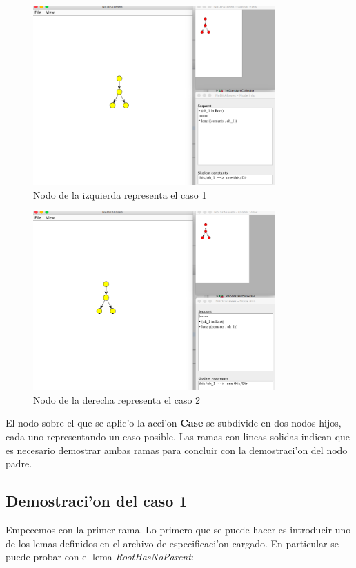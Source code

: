 \begin{figure}[H]
	\includegraphics[width=350px]{img/ejemplo/7.png}
	\centering
	\caption{Nodo de la izquierda representa el caso 1}
\end{figure}

\begin{figure}[H]
	\includegraphics[width=350px]{img/ejemplo/8.png}
	\centering
	\caption{Nodo de la derecha representa el caso 2}
\end{figure}

El nodo sobre el que se aplic'o la acci'on \textbf{Case} se subdivide en dos nodos hijos, cada uno representando un caso posible. Las ramas con lineas solidas indican que es necesario demostrar ambas ramas para concluir con la demostraci'on del nodo padre.

\subsection{Demostraci'on del caso 1}

Empecemos con la primer rama. Lo primero que se puede hacer es introducir uno de los lemas definidos en el archivo de especificaci'on cargado. En particular se puede probar con el lema \textit{RootHasNoParent}:

